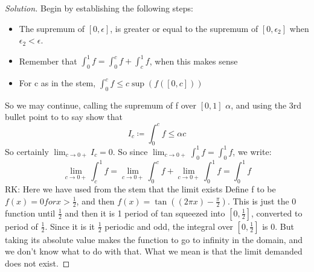 \documentclass{article}
\newenvironment{problem}[2][Problem]{\begin{trivlist}
\item[\hskip \labelsep {\bfseries #1}\hskip \labelsep {\bfseries #2.}]}{\end{trivlist}}
\newenvironment{solution}{\begin{proof}[Solution]}{\end{proof}}
\begin{document}
\begin{problem}{6.7}
\end{problem}

\begin{solution}
	Begin by establishing the following steps: 
	\begin{itemize}
		\item The supremum of $[0,\epsilon]$, is greater or equal to the supremum of $[0, \epsilon_{2}]$ when $\epsilon_{2}<\epsilon$.
		\item	Remember that $\int_{0}^{1}f = \int_{0}^{c}f + \int_{c}^{1}f$, when this makes sense
			\item For c as in the stem, $\int_{0}^{c}f \leq c\sup (f([0,c]))$
	\end{itemize}
	So we may continue, calling the supremum of f over $[0,1]$ $\alpha$, and using the 3rd bullet point to to say show that \[
		I_{c} \coloneqq	 \int_{0}^{c}f \leq \alpha c
	\]
	So certainly $\lim_{c \to 0+}   I_{c} = 0$. So since $\lim_{c \to 0+}  \int_{0}^{1}f = \int_{0}^{1}f$, we write: \[
		\lim_{ c \to 0+}\int_{c}^{1}  f = \lim_{c \to 0+} \int_{0}^{c}f + \lim_{ c\to 0+} \int_{0}^{1}f  = \int_{0}^{1}f        
	\]   RK: Here we have used from the stem that the limit exists
	Define f to be $f(x) = 0 for x>\frac{1}{2}$, and then $f(x) = \tan((2\pi x) - \frac{\pi}{2})$. This is just the 0 function until $\frac{1}{2}$ and then it is 1 period of tan squeezed into $[0,\frac{1}{2}]$, converted to period of $\frac{1}{2}$. Since it is it $\frac{1}{2}$ periodic and odd, the integral over $[0, \frac{1}{2}]$ is 0. But taking its absolute value makes the function to go to infinity in the domain, and we don't know what to do with that. What we mean is that the limit demanded does not exist.
\end{solution}
\end{document}
